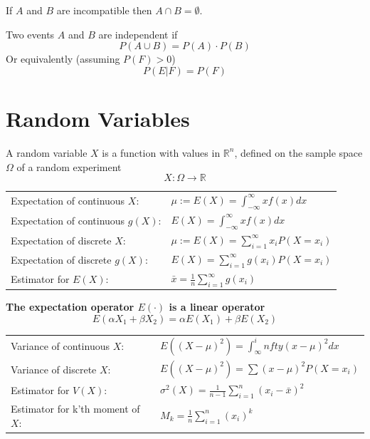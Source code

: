 \documentclass[11pt]{article}
\theoremstyle{definition}
\newcommand*\R{\mathbb{R}}
\begin{document}
If $A$ and $B$ are incompatible then $A\cap B = \emptyset$.
\begin{definition}
	Two events $A$ and $B$ are independent if
	\begin{equation*}
		P(A\cup B) = P(A)\cdot P(B)
	\end{equation*}
	Or equivalently (assuming $P(F)>0$)
	\begin{equation*}
		P(E|F) = P(F)
	\end{equation*}
\end{definition}

\section{Random Variables}

\begin{definition}
	A random variable $X$ is a function with values in $\R^n$, defined on the sample space $\Omega$ of a random experiment
	\begin{equation*}
		X: \Omega \rightarrow \R
	\end{equation*}
\end{definition}

\begin{tabularx}{\linewidth}{lX}
	Expectation of continuous $X$: & $\mu := E(X) = \int_{-\infty}^{\infty} x f(x) dx$\\
	Expectation of continuous $g(X)$: & $E(X) = \int_{-\infty}^{\infty} x f(x) dx$\\
	Expectation of discrete $X$: & $\mu := E(X) = \sum_{i=1}^{\infty} x_i P(X = x_i)$\\
	Expectation of discrete $g(X)$: & $E(X) = \sum_{i=1}^{\infty} g(x_i) P(X = x_i)$\\
	Estimator for $E(X)$: & $ \bar{x} = \frac{1}{n} \sum_{i=1}^{\infty} g(x_i)$
\end{tabularx}

\textbf{The expectation operator $E(\cdot)$ is a linear operator}
\begin{equation*}
E(\alpha X_1 + \beta X_2) = \alpha E(X_1) + \beta E(X_2)
\end{equation*}


\begin{tabularx}{\linewidth}{lX}
	Variance of continuous $X$: & $ E((X-\mu)^2) = \int_{\infty}^infty (x-\mu)^2 dx $\\
	Variance of discrete $X$: & $ E((X-\mu)^2) = \sum (x-\mu)^2 P(X=x_i)  $\\
	Estimator for $V(X)$: & $\sigma^2(X) = \frac{1}{n-1} \sum_{i=1}^{n}(x_i - \bar{x})^2$\\
	Estimator for k'th moment of $X$: & $M_k = \frac{1}{n}\sum_{i=1}^{n}(x_i)^k$
\end{tabularx}
\end{document}
